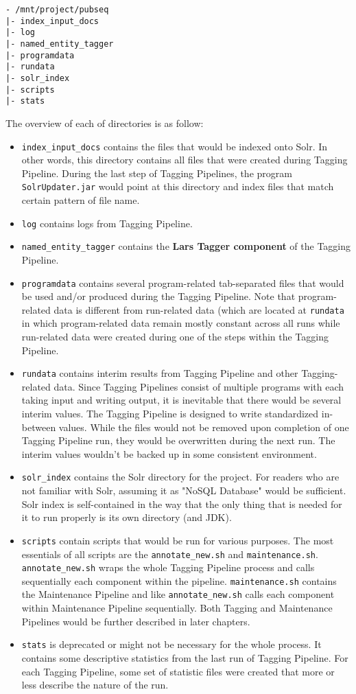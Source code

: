 \begin{verbatim}
- /mnt/project/pubseq
|- index_input_docs
|- log
|- named_entity_tagger
|- programdata
|- rundata
|- solr_index
|- scripts
|- stats 
\end{verbatim}

The overview of each of directories is as follow:

\begin{itemize}
\item \texttt{index\_input\_docs} contains the files that would be indexed onto Solr. In other words, this directory contains all files that were created during Tagging Pipeline. During the last step of Tagging Pipelines, the program \texttt{SolrUpdater.jar} would point at this directory and index files that match certain pattern of file name.
\item \texttt{log} contains logs from Tagging Pipeline.
\item \texttt{named\_entity\_tagger} contains the \textbf{Lars Tagger component} of the Tagging Pipeline.
\item \texttt{programdata} contains several program-related tab-separated files that would be used and/or produced during the Tagging Pipeline. Note that program-related data is different from run-related data (which are located at \texttt{rundata} in which program-related data remain mostly constant across all runs while run-related data were created during one of the steps within the Tagging Pipeline. 
\item \texttt{rundata} contains interim results from Tagging Pipeline and other Tagging-related data. Since Tagging Pipelines consist of multiple programs with each taking input and writing output, it is inevitable that there would be several interim values. The Tagging Pipeline is designed to write standardized in-between values. While the files would not be removed upon completion of one Tagging Pipeline run, they would be overwritten during the next run. The interim values wouldn't be backed up in some consistent environment.
\item \texttt{solr\_index} contains the Solr directory for the project. For readers who are not familiar with Solr, assuming it as "NoSQL Database" would be sufficient. Solr index is self-contained in the way that the only thing that is needed for it to run properly is its own directory (and JDK).
\item \texttt{scripts} contain scripts that would be run for various purposes. The most essentials of all scripts are the \texttt{annotate\_new.sh} and \texttt{maintenance.sh}. \texttt{annotate\_new.sh} wraps the whole Tagging Pipeline process and calls sequentially each component within the pipeline. \texttt{maintenance.sh} contains the Maintenance Pipeline and like \texttt{annotate\_new.sh} calls each component within Maintenance Pipeline sequentially. Both Tagging and Maintenance Pipelines would be further described in later chapters.
\item \texttt{stats} is deprecated or might not be necessary for the whole process. It contains some descriptive statistics from the last run of Tagging Pipeline. For each Tagging Pipeline, some set of statistic files were created that more or less describe the nature of the run.
\end{itemize}